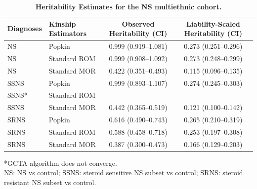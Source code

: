 \documentclass[11pt]{article}
\begin{document}
\begin{table}[h!]
  \centering
  \small
  \caption{
    \textbf{Heritability Estimates for the NS multiethnic cohort.}
  }
  \label{tab:NS_herit_table}
  \begin{tabular}{l l c c}
    \toprule
    Diagnoses & Kinship Estimators & Observed Heritability (CI) & Liability-Scaled Heritability (CI) \\
    \midrule
    NS   & Popkin        & 0.999 (0.919–1.081)  & 0.273 (0.251–0.296) \\
    NS   & Standard ROM  & 0.999 (0.908–1.092)  & 0.273 (0.248–0.299) \\
    NS   & Standard MOR  & 0.422 (0.351–0.493)  & 0.115 (0.096–0.135) \\
    SSNS & Popkin        & 0.999 (0.893–1.107)  & 0.274 (0.245–0.303) \\
    SSNS* & Standard ROM & -                    & - \\
    SSNS & Standard MOR  & 0.442 (0.365–0.519)  & 0.121 (0.100–0.142) \\
    SRNS & Popkin        & 0.616 (0.490–0.743)  & 0.265 (0.210–0.319) \\
    SRNS & Standard ROM  & 0.588 (0.458–0.718)  & 0.253 (0.197–0.308) \\
    SRNS & Standard MOR  & 0.387 (0.300–0.473)  & 0.166 (0.129–0.203) \\
    \bottomrule
  \end{tabular}
  \begin{flushleft} 
    *GCTA algorithm does not converge. \\
     NS: NS vs control; SSNS: steroid sensitive NS subset vs control; SRNS: steroid resistant NS subset vs control.
  \end{flushleft}
\end{table}
\end{document}
